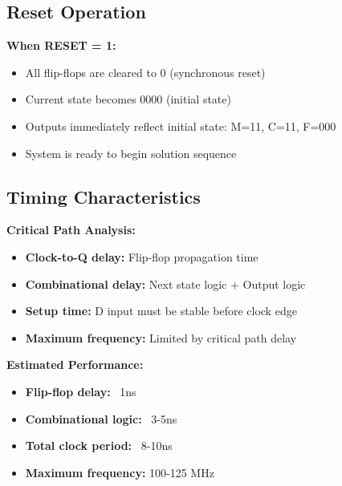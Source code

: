 \documentclass[12pt]{article}
\begin{document}
\subsection{Reset Operation}

\textbf{When RESET = 1:}
\begin{itemize}
    \item All flip-flops are cleared to 0 (synchronous reset)
    \item Current state becomes 0000 (initial state)
    \item Outputs immediately reflect initial state: M=11, C=11, F=000
    \item System is ready to begin solution sequence
\end{itemize}

\subsection{Timing Characteristics}

\textbf{Critical Path Analysis:}
\begin{itemize}
    \item \textbf{Clock-to-Q delay:} Flip-flop propagation time
    \item \textbf{Combinational delay:} Next state logic + Output logic
    \item \textbf{Setup time:} D input must be stable before clock edge
    \item \textbf{Maximum frequency:} Limited by critical path delay
\end{itemize}

\textbf{Estimated Performance:}
\begin{itemize}
    \item \textbf{Flip-flop delay:} ~1ns
    \item \textbf{Combinational logic:} ~3-5ns
    \item \textbf{Total clock period:} ~8-10ns
    \item \textbf{Maximum frequency:} 100-125 MHz
\end{itemize}
\end{document}
